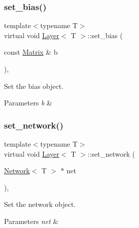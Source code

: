 \subsubsection{\texorpdfstring{set\_bias()}{set\_bias()}}
{\footnotesize\ttfamily template$<$typename T$>$ \\
virtual void \mbox{\hyperlink{class_layer}{Layer}}$<$ T $>$\+::set\+\_\+bias (\begin{DoxyParamCaption}\item[{const \mbox{\hyperlink{class_layer_a22b1e7286096aa62bd245536c8ebdaf1}{Matrix}} \&}]{b }\end{DoxyParamCaption})\hspace{0.3cm}{\ttfamily [inline]}, {\ttfamily [virtual]}}



Set the bias object. 


\begin{DoxyParams}{Parameters}
{\em b} & \\
\hline
\end{DoxyParams}
\mbox{\label{class_layer_a6281daa82294d6979eaa59acf0ea8f31}} 
\subsubsection{\texorpdfstring{set\_network()}{set\_network()}}
{\footnotesize\ttfamily template$<$typename T$>$ \\
virtual void \mbox{\hyperlink{class_layer}{Layer}}$<$ T $>$\+::set\+\_\+network (\begin{DoxyParamCaption}\item[{\mbox{\hyperlink{class_network}{Network}}$<$ T $>$ $\ast$}]{net }\end{DoxyParamCaption})\hspace{0.3cm}{\ttfamily [inline]}, {\ttfamily [virtual]}}



Set the network object. 


\begin{DoxyParams}{Parameters}
{\em net} & \\
\hline
\end{DoxyParams}
\mbox{\label{class_layer_a8fd54bf1a860868b13f4365a264c693c}} 

